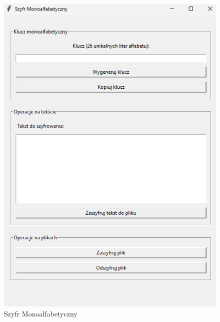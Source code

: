 \documentclass[12pt,a4paper]{article}
\begin{document}
\begin{figure}[!htb]
\begin{center}
\includegraphics[scale=0.45]{pictures/monoalfabetyczny.png}
\caption{Szyfr Monoalfabetyczny}
\label{fig:Szyfr Monoalfabetyczny}
\end{center}
\end{figure}


\newpage
\end{document}
